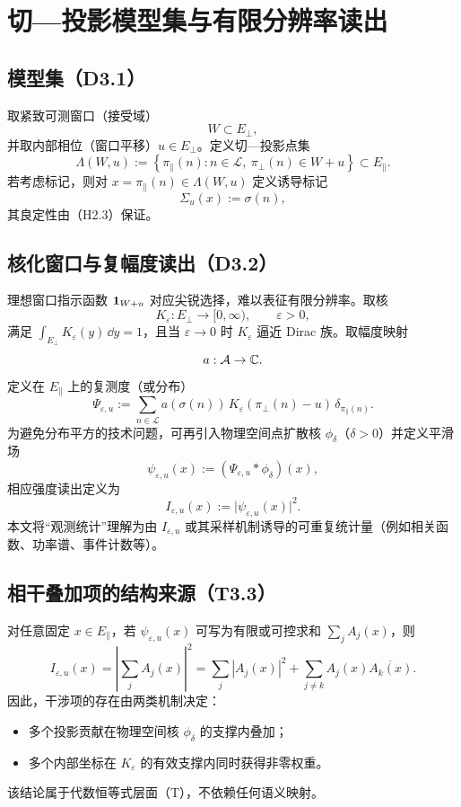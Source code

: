\section{切—投影模型集与有限分辨率读出}\label{sec:cut-project-readout}

\subsection{模型集（D3.1）}

取紧致可测窗口（接受域）
\[
W\subset E_{\perp},
\]
并取内部相位（窗口平移）$u\in E_{\perp}$。定义切—投影点集
\[
\Lambda(W,u):=\left\{\pi_{\parallel}(n):n\in\mathcal{L},\ \pi_{\perp}(n)\in W+u\right\}\subset E_{\parallel}.
\]
若考虑标记，则对 $x=\pi_{\parallel}(n)\in\Lambda(W,u)$ 定义诱导标记
\[
\Sigma_{u}(x):=\sigma(n),
\]
其良定性由（H2.3）保证。

\subsection{核化窗口与复幅度读出（D3.2）}

理想窗口指示函数 $\mathbf{1}_{W+u}$ 对应尖锐选择，难以表征有限分辨率。取核
\[
K_{\varepsilon}:E_{\perp}\to[0,\infty),\qquad \varepsilon>0,
\]
满足 $\int_{E_{\perp}}K_{\varepsilon}(y)\,\dd y=1$，且当 $\varepsilon\to 0$ 时 $K_{\varepsilon}$ 逼近 Dirac 族。取幅度映射
\[
a:\mathcal{A}\to\mathbb{C}.
\]
定义在 $E_{\parallel}$ 上的复测度（或分布）
\[
\Psi_{\varepsilon,u}:=\sum_{n\in\mathcal{L}} a(\sigma(n))\,K_{\varepsilon}(\pi_{\perp}(n)-u)\,\delta_{\pi_{\parallel}(n)} .
\]
为避免分布平方的技术问题，可再引入物理空间点扩散核 $\phi_{\delta}$（$\delta>0$）并定义平滑场
\[
\psi_{\varepsilon,u}(x):=(\Psi_{\varepsilon,u}*\phi_{\delta})(x),
\]
相应强度读出定义为
\[
I_{\varepsilon,u}(x):=\big|\psi_{\varepsilon,u}(x)\big|^{2}.
\]
本文将“观测统计”理解为由 $I_{\varepsilon,u}$ 或其采样机制诱导的可重复统计量（例如相关函数、功率谱、事件计数等）。

\subsection{相干叠加项的结构来源（T3.3）}

对任意固定 $x\in E_{\parallel}$，若 $\psi_{\varepsilon,u}(x)$ 可写为有限或可控求和 $\sum_{j}A_j(x)$，则
\[
I_{\varepsilon,u}(x)=\left|\sum_{j}A_j(x)\right|^{2}
=\sum_{j}|A_j(x)|^{2}+\sum_{j\neq k}A_j(x)\overline{A_k(x)}.
\]
因此，干涉项的存在由两类机制决定：
\begin{itemize}
  \item 多个投影贡献在物理空间核 $\phi_{\delta}$ 的支撑内叠加；
  \item 多个内部坐标在 $K_{\varepsilon}$ 的有效支撑内同时获得非零权重。
\end{itemize}
该结论属于代数恒等式层面（T），不依赖任何语义映射。

